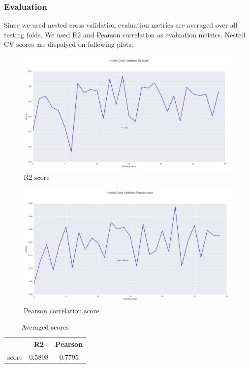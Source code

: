 \documentclass[10pt, a4paper]{article}
\begin{document}
\begin{table}[h!]
\subsubsection{Evaluation}
Since we used nested cross validation evaluation metrics are averaged over all testing folds. We used R2 and Pearson correlation as evaluation metrics. Nested CV scores are dispalyed on following plots:


\begin{figure}[h!]
\begin{center}
	\centering
	\includegraphics[scale=0.36]{R2.png}
	\caption{R2 score}
\end{center}
\end{figure}


\begin{figure}[h!]
\begin{center}
	\centering
	\includegraphics[scale=0.36]{Pearson.png}
	\caption{Pearson correlation score}
\end{center}
\end{figure}

\begin{table}
\caption{Averaged scores}
\label{tab:narrow-table}
\begin{center}
\begin{tabular}{ccc}
\toprule
& R2 & Pearson\\
\midrule
score & 0.5898 & 0.7795 \\
\bottomrule
\end{tabular}
\end{center}
\end{table}


\end{table}
\end{document}
